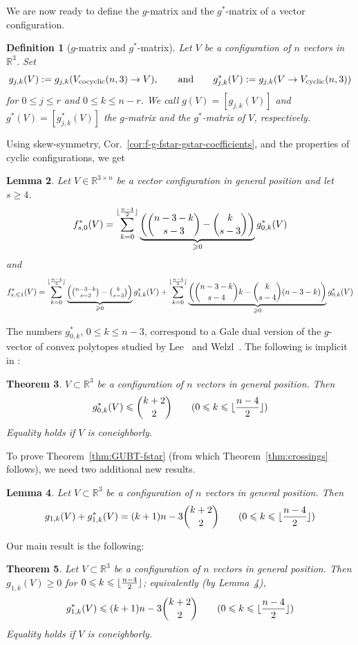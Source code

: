 \documentclass[11pt]{article}
\newtheorem{theorem}{Theorem}
\newtheorem{lemma}[theorem]{Lemma}
\newtheorem{definition}[theorem]{Definition}
\renewcommand{\leq}{\leqslant}
\renewcommand{\geq}{\geqslant}
\newcommand{\R}{\mathbb{R}}
\DeclarePairedDelimiter\floor{\lfloor}{\rfloor}
\newcommand{\cyclic}{V_{\textup{cyclic}}}
\newcommand{\cocyclic}{V_{\textup{cocyclic}}}
\begin{document}
We are now ready to define the $g$-matrix and the $g^*$-matrix of a vector configuration.
\begin{definition}[$g$-matrix and $g^*$-matrix]
\label{def:g-matrix}
Let $V$ be a configuration of $n$ vectors in $\mathbb{R}^3$. Set 
\[
g_{j,k} (V) := g_{j,k} (\cocyclic(n,3) \to V), \qquad\textrm{and}\qquad g^*_{j,k} (V) := g_{j,k} (V \to \cyclic(n,3))
\]
for $0\leq j\leq r$ and $0\leq k\leq n-r$. We call $g(V)=[g_{j,k}(V)]$ and $g^*(V)=[g^*_{j,k}(V)]$ the \emph{$g$-matrix} and the \emph{$g^*$-matrix} of $V$, respectively.
\end{definition}
%
Using skew-symmetry, Cor.~\ref{cor:f-g-fstar-gstar-coefficients}, and the properties of cyclic configurations, we get 
\begin{lemma} 
\label{lem:fstar-gstar-b1}
Let $V\in \R^{3\times n}$ be a vector configuration in general position and let $s\geq 4$. 
\[
f_{s,0}^*(V) = \sum_{k=0}^{\floor{\frac{n-4}{2}}}\underbrace{\left( \binom{n-3-k}{s-3}-\binom{k}{s-3}\right)}_{\geq 0}  g^*_{0,k}(V)
\]
and
\[
f^*_{s,\leq 1}(V) = \sum_{k=0}^{\floor{\frac{n-4}{2}}} \underbrace{\textstyle \left( \binom{n-3-k}{s-3}-\binom{k}{s-3}\right)}_{\geq 0}  g^*_{1,k}(V) +  \sum_{k=0}^{\floor{\frac{n-4}{2}}} \underbrace{\left( \binom{n-3-k}{s-4} k - \binom{k}{s-4} (n-3-k) \right)}_{\geq 0}  g^*_{0,k}(V) 
\]
\end{lemma}
The numbers $g^*_{0,k}$, $0\leq k\leq n-3$, correspond to a Gale dual version of the $g$-vector of convex polytopes studied by Lee~\cite{Lee:1991aa} and Welzl~\cite{Welzl:2001aa}. The following is implicit in 
 \cite[Sec.~4]{Welzl:2001aa}:
 \begin{theorem} $V \subset \R^3$ be a configuration of $n$ vectors in general position. Then
 \label{thm:g-star-welzl}
\[g^*_{0,k}(V) \leq  \binom{k+2}{2}\qquad (0\leq k\leq \floor{\frac{n-4}{2}})\]
Equality holds if $V$ is coneighborly.
\end{theorem}
To prove Theorem~\ref{thm:GUBT-fstar} (from which Theorem~\ref{thm:crossings} follows), we need two additional new results.
%
\begin{lemma}
\label{lem:g-gstar-j1}
Let $V \subset \R^3$ be a configuration of $n$ vectors in general position. Then
\[g_{1,k}(V)+ g^*_{1,k}(V)=(k+1)n-3\binom{k+2}{2} \qquad (0\leq k\leq \floor{\frac{n-4}{2}})\]
\end{lemma}
Our main result is the following:

\begin{theorem} 
\label{thm:g1-rank3}
Let $V \subset \R^3$ be a configuration of $n$ vectors in general position. Then $g_{1,k}(V) \geq 0$ for $0\leq k\leq \floor{\frac{n-4}{2}}$; equivalently (by Lemma~\ref{lem:g-gstar-j1}),
\[g^*_{1,k}(V) \leq (k+1)n-3\binom{k+2}{2} \qquad (0\leq k\leq \floor{\frac{n-4}{2}} )\]
Equality holds if $V$ is coneighborly.
\end{theorem}
\end{document}
